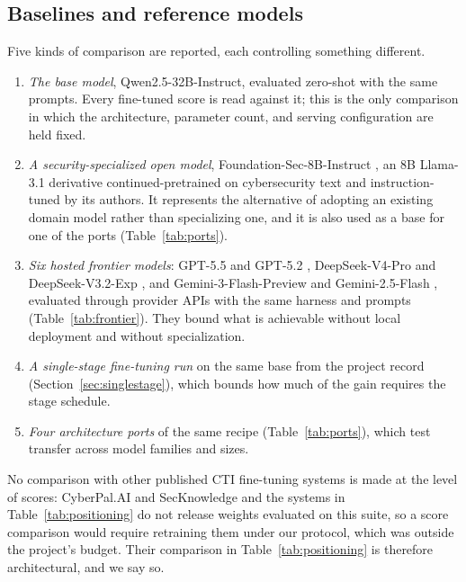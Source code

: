 \documentclass[twocolumn]{svjour3}
\begin{document}
\subsection{Baselines and reference models}\label{sec:baselines}
Five kinds of comparison are reported, each controlling something different.
\begin{enumerate}
\item \emph{The base model}, Qwen2.5-32B-Instruct, evaluated zero-shot with the same prompts. Every fine-tuned score is read against it; this is the only comparison in which the architecture, parameter count, and serving configuration are held fixed.
\item \emph{A security-specialized open model}, Foundation-Sec-8B-Instruct \cite{kassianik2025foundationsec}, an 8B Llama-3.1 derivative continued-pretrained on cybersecurity text and instruction-tuned by its authors. It represents the alternative of adopting an existing domain model rather than specializing one, and it is also used as a base for one of the ports (Table~\ref{tab:ports}).
\item \emph{Six hosted frontier models}: GPT-5.5 and GPT-5.2 \cite{openai2026gpt55,openai2025gpt52}, DeepSeek-V4-Pro and DeepSeek-V3.2-Exp \cite{deepseek2026v4,deepseek2025v32exp}, and Gemini-3-Flash-Preview and Gemini-2.5-Flash \cite{google2025gemini3flash,comanici2025gemini25}, evaluated through provider APIs with the same harness and prompts (Table~\ref{tab:frontier}). They bound what is achievable without local deployment and without specialization.
\item \emph{A single-stage fine-tuning run} on the same base from the project record (Section~\ref{sec:singlestage}), which bounds how much of the gain requires the stage schedule.
\item \emph{Four architecture ports} of the same recipe (Table~\ref{tab:ports}), which test transfer across model families and sizes.
\end{enumerate}
No comparison with other published CTI fine-tuning systems is made at the level of scores: CyberPal.AI and SecKnowledge \cite{levi2025cyberpal} and the systems in Table~\ref{tab:positioning} do not release weights evaluated on this suite, so a score comparison would require retraining them under our protocol, which was outside the project's budget. Their comparison in Table~\ref{tab:positioning} is therefore architectural, and we say so.
\end{document}
